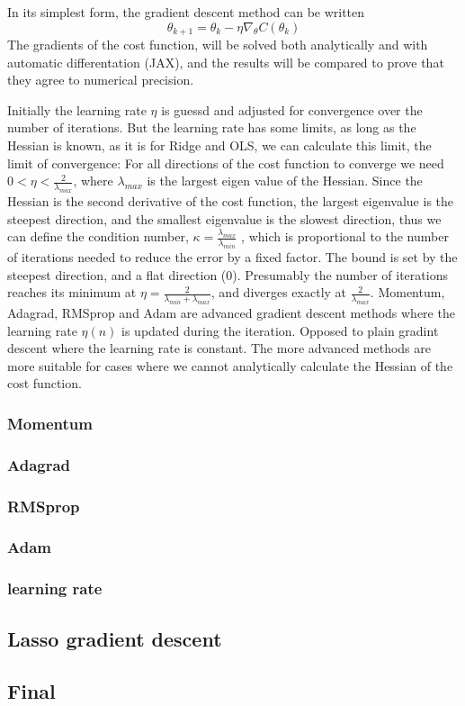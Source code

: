 \documentclass[aps,rmp,reprint,amsmath,amssymb,longbibliography]{revtex4-1}
\begin{document}
In its simplest form, the gradient descent method can be written
\begin{equation}
  \theta_{k+1} = \theta_k - \eta\nabla_{\theta}C(\theta_k)
\end{equation}
\cite{Project1}
The gradients of the cost function, will be solved both analytically
and with automatic differentation (JAX), and the results will be compared
to prove that they agree to numerical precision.

Initially the learning rate $\eta$ is guessd and adjusted for convergence
over the number of iterations. But the learning rate has some limits,
as long as the Hessian is known, as it is for Ridge and OLS, we can 
calculate this limit, the limit of convergence:
For all directions of the cost function to converge we need
$0 < \eta < \frac{2}{\lambda_{max}}$, where $\lambda_{max}$ is 
the largest eigen value of the Hessian. Since the Hessian is the 
second derivative of the cost function, the largest eigenvalue
is the steepest direction, and the smallest eigenvalue is the 
slowest direction, thus we can define the condition number, $\kappa = \frac{\lambda_{max}}{\lambda_{min}}$
, which is proportional to the number of iterations needed to reduce
the error by a fixed factor. The bound is set by the steepest direction,
and a flat direction (0). Presumably the number of iterations reaches 
its minimum at $\eta = \frac{2}{\lambda_{min}+\lambda_{max}}$, and diverges
exactly at $\frac{2}{\lambda_{max}}$. \newline 
Momentum, Adagrad, RMSprop and Adam are advanced gradient descent methods
where the learning rate $\eta(n)$ is updated during the iteration.
Opposed to plain gradint descent where the learning rate is constant.
The more advanced methods are more suitable for cases where we cannot
analytically calculate the Hessian of the cost function. 

\subsubsection{Momentum}
\subsubsection{Adagrad}
\subsubsection{RMSprop}
\subsubsection{Adam}

\subsubsection{learning rate}

\subsection{Lasso gradient descent}

\subsection{Final}

\end{document}
